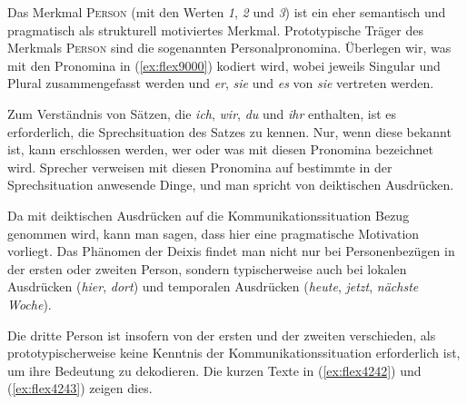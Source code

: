
Das Merkmal \textsc{Person} (mit den Werten \textit{1}, \textit{2} und \textit{3}) ist ein eher semantisch und pragmatisch als strukturell motiviertes Merkmal.
Prototypische Träger des Merkmals \textsc{Person} sind die sogenannten Personalpronomina.
Überlegen wir, was mit den Pronomina in (\ref{ex:flex9000}) kodiert wird, wobei jeweils Singular und Plural zusammengefasst werden und \textit{er}, \textit{sie} und \textit{es} von \textit{sie} vertreten werden.

\begin{exe}
  \ex \label{ex:flex9000}
  \begin{xlist}
  \end{xlist}
\end{exe}


Zum Verständnis von Sätzen, die \textit{ich}, \textit{wir}, \textit{du} und \textit{ihr} enthalten, ist es erforderlich, die Sprechsituation des Satzes zu kennen.
Nur, wenn diese bekannt ist, kann erschlossen werden, wer oder was mit diesen Pronomina bezeichnet wird.
Sprecher verweisen mit diesen Pronomina auf bestimmte in der Sprechsituation anwesende Dinge, und man spricht von deiktischen Ausdrücken.

\newpage


Da mit deiktischen Ausdrücken auf die Kommunikationssituation Bezug genommen wird, kann man sagen, dass hier eine pragmatische Motivation vorliegt.
Das Phänomen der Deixis findet man nicht nur bei Personenbezügen in der ersten oder zweiten Person, sondern typischerweise auch bei lokalen Ausdrücken (\textit{hier}, \textit{dort}) und temporalen Ausdrücken (\textit{heute}, \textit{jetzt}, \textit{nächste Woche}).

Die dritte Person ist insofern von der ersten und der zweiten verschieden, als prototypischerweise keine Kenntnis der Kommunikationssituation erforderlich ist, um ihre Bedeutung zu dekodieren.
Die kurzen Texte in (\ref{ex:flex4242}) und (\ref{ex:flex4243}) zeigen dies.

